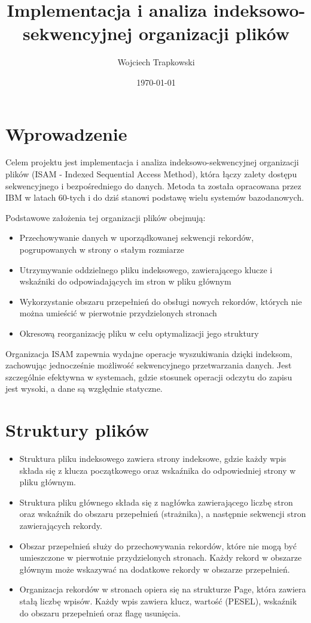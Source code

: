 \documentclass[12pt]{article}
\title{Implementacja i analiza indeksowo-sekwencyjnej organizacji plików}
\author{Wojciech Trapkowski}
\date{\today}
\begin{document}
\maketitle

\section{Wprowadzenie}
Celem projektu jest implementacja i analiza indeksowo-sekwencyjnej organizacji plików (ISAM - Indexed Sequential Access Method), która łączy zalety dostępu sekwencyjnego i bezpośredniego do danych. Metoda ta została opracowana przez IBM w latach 60-tych i do dziś stanowi podstawę wielu systemów bazodanowych.

Podstawowe założenia tej organizacji plików obejmują:
\begin{itemize}
    \item Przechowywanie danych w uporządkowanej sekwencji rekordów, pogrupowanych w strony o stałym rozmiarze
    \item Utrzymywanie oddzielnego pliku indeksowego, zawierającego klucze i wskaźniki do odpowiadających im stron w pliku głównym
    \item Wykorzystanie obszaru przepełnień do obsługi nowych rekordów, których nie można umieścić w pierwotnie przydzielonych stronach
    \item Okresową reorganizację pliku w celu optymalizacji jego struktury
\end{itemize}

Organizacja ISAM zapewnia wydajne operacje wyszukiwania dzięki indeksom, zachowując jednocześnie możliwość sekwencyjnego przetwarzania danych. Jest szczególnie efektywna w systemach, gdzie stosunek operacji odczytu do zapisu jest wysoki, a dane są względnie statyczne.

\section{Struktury plików}
\begin{itemize}    
    \item Struktura pliku indeksowego zawiera strony indeksowe, gdzie każdy wpis składa się z klucza początkowego oraz wskaźnika do odpowiedniej strony w pliku głównym.

    \item Struktura pliku głównego składa się z nagłówka zawierającego liczbę stron oraz wskaźnik do obszaru przepełnień (strażnika), a następnie sekwencji stron zawierających rekordy.
    
    \item Obszar przepełnień służy do przechowywania rekordów, które nie mogą być umieszczone w pierwotnie przydzielonych stronach. Każdy rekord w obszarze głównym może wskazywać na dodatkowe rekordy w obszarze przepełnień.
    
    \item Organizacja rekordów w stronach opiera się na strukturze Page, która zawiera stałą liczbę wpisów. Każdy wpis zawiera klucz, wartość (PESEL), wskaźnik do obszaru przepełnień oraz flagę usunięcia.
\end{itemize}
\end{document}

